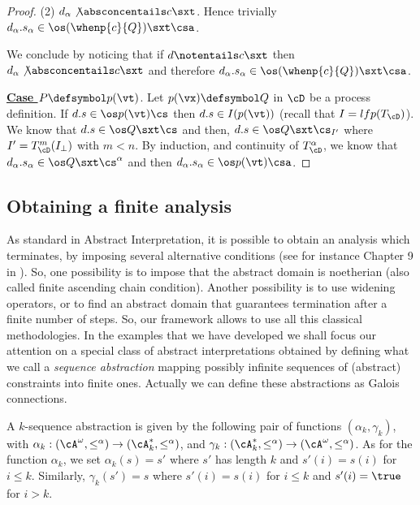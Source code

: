 \documentclass{tlp}
\begin{document}
\begin{proof}
\noindent(2) $d_\alpha \not\absconcentails c\sxt$. Hence trivially $d_\alpha.s_\alpha \in \os (\whenp{c}{Q})\sxt \csa$. 

We conclude by noticing that if $d\notentails c\sxt$ then 
$d_\alpha \not\absconcentails c\sxt$ and therefore $d_\alpha.s_\alpha \in \os (\whenp{c}{Q})\sxt \csa$.


\noindent \underline{\bf Case 	 $P\defsymbol p(\vt)$}. 
Let  $p(\vx) \defsymbol  Q$ in $\cD$ be a process definition. 
	If $d.s \in \os p(\vt) \cs$ then $d.s \in I(p(\vt))$ (recall that $I=lfp(T_{\cD})$). We know that $d.s \in \os Q\sxt \cs$ and then, 
	 $d.s \in \os Q\sxt \cs_{I'}$ where 
	 $I' = T_{\cD}^{m}(I_\bot)$ with $m < n$. By induction, and continuity of $T_{\cD}^\alpha$,  we know that 
	$d_\alpha.s_\alpha \in \os Q\sxt\cs^\alpha$ and then 
	$d_\alpha.s_\alpha \in \os p(\vt)\csa$.
\end{proof}









\subsection{Obtaining a finite analysis}
As standard in Abstract Interpretation, it is possible to obtain an 
analysis which terminates, by imposing several alternative conditions 
(see for instance Chapter 9 in \cite{CC92}).
So, one possibility is to impose that the abstract domain is 
noetherian (also called finite ascending chain condition). Another 
possibility is to use widening operators, or to find an abstract 
domain that guarantees termination after a finite number of steps. So, our framework allows to 
use all this classical methodologies.
In the examples that we have developed 
we shall focus our attention on a special class of abstract interpretations 
obtained 
by defining 
what we call a \emph{sequence abstraction} mapping possibly infinite sequences of (abstract) 
constraints into finite ones. Actually we can define these 
abstractions 
as Galois connections.

\begin{definition}
A $k$-sequence abstraction  is given by the
following pair of functions $(\alpha_{k},\gamma_{k})$, with 
$\alpha_{k}: (\cA^{\omega},\leq^\alpha) \rightarrow (\cA_{k}^{*},\leq^\alpha)$, 
and $\gamma_{k}: (\cA_{k}^{*},\leq^\alpha) \rightarrow (\cA^{\omega},\leq^\alpha)$.
As for  the function $\alpha_{k}$, we set $\alpha_{k}(s)=s'$ where $s'$ has length $k$  and $s'(i)=s(i)$ for $i\leq k$. Similarly,  $\gamma_{k}(s') = s$ where $s'(i)=s(i)$ for $i\leq k$ and $s'(i)=\true$ for $i>k$.
\end{definition}
\end{document}
